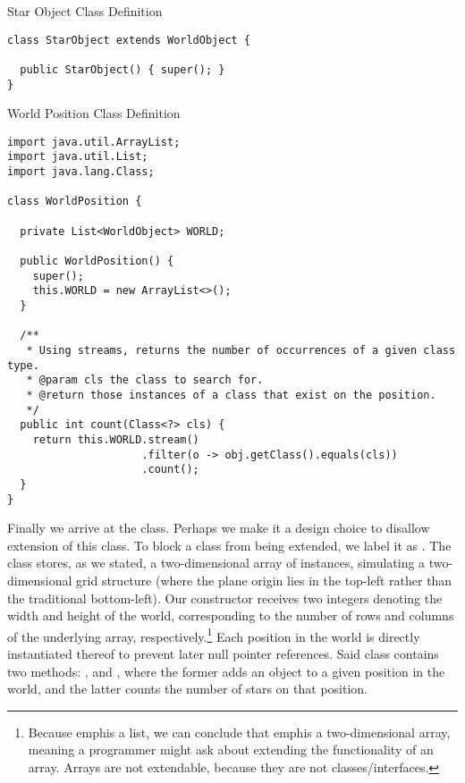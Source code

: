 \begin{cl}{Star Object Class Definition}
\begin{lstlisting}[language=MyJava]
class StarObject extends WorldObject {
  
  public StarObject() { super(); }
}
\end{lstlisting}
\end{cl}

\begin{cl}{World Position Class Definition}
\begin{lstlisting}[language=MyJava]
import java.util.ArrayList;
import java.util.List;
import java.lang.Class;

class WorldPosition {

  private List<WorldObject> WORLD;

  public WorldPosition() { 
    super(); 
    this.WORLD = new ArrayList<>();  
  }

  /**
   * Using streams, returns the number of occurrences of a given class type.
   * @param cls the class to search for.
   * @return those instances of a class that exist on the position.
   */
  public int count(Class<?> cls) {
    return this.WORLD.stream()
                     .filter(o -> obj.getClass().equals(cls))
                     .count();
  }
}
\end{lstlisting}
\end{cl}

Finally we arrive at the  class. Perhaps we make it a design choice to disallow extension of this class. To block a class from being extended, we label it as . The  class stores, as we stated, a two-dimensional array of  instances, simulating a two-dimensional grid structure (where the plane origin lies in the top-left rather than the traditional bottom-left). Our constructor receives two integers denoting the width and height of the world, corresponding to the number of rows and columns of the underlying array, respectively.\footnote{Because  emph{is} a list, we can conclude that  emph{is} a two-dimensional array, meaning a programmer might ask about extending the functionality of an array. Arrays are not extendable, because they are not classes/interfaces.} Each position in the world is directly instantiated thereof to prevent later null pointer references. Said  class contains two methods: , and , where the former adds an object to a given position in the world, and the latter counts the number of stars on that position.


